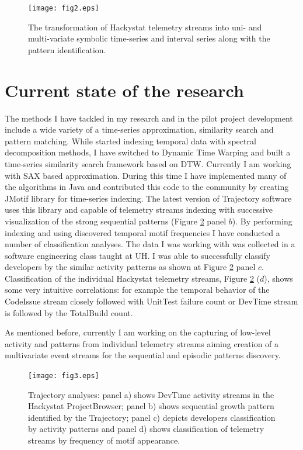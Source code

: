 \documentclass[11pt,oneside]{article}
\begin{document}
\begin{figure}[tbp]
   \centering
   \texttt{[image: fig2.eps]}
   \caption{The transformation of Hackystat telemetry streams into uni- and multi-variate symbolic time-series and interval series along with the pattern identification.}
   \label{fig:fig2}
\end{figure}

\section{Current state of the research}
The methods I have tackled in my research and in the pilot project development include a wide variety of a time-series approximation, similarity search and pattern matching. While started indexing temporal data with spectral decomposition methods, I have switched to Dynamic Time Warping and built a time-series similarity search framework based on DTW. Currently I am working with SAX based approximation. During this time I have implemented many of the algorithms in Java and contributed this code to the community by creating JMotif library for time-series indexing. The latest version of Trajectory software uses this library and capable of telemetry streams indexing with successive visualization of the strong sequential patterns (Figure \ref{fig:fig3} panel $b$). By performing indexing and using discovered temporal motif frequencies I have conducted a number of classification analyses. The data I was working with was collected in a software engineering class taught at UH. I was able to successfully classify developers by the similar activity patterns as shown at Figure \ref{fig:fig3} panel $c$. Classification of the individual Hackystat telemetry streams, Figure \ref{fig:fig3} ($d$), shows some very intuitive correlations: for example the temporal behavior of the CodeIssue stream closely followed with UnitTest failure count or DevTime stream is followed by the TotalBuild count.

As mentioned before, currently I am working on the capturing of low-level activity and patterns from individual telemetry streams aiming creation of a multivariate event streams for the sequential and episodic patterns discovery.

\begin{figure}[tbp]
   \centering
   \texttt{[image: fig3.eps]}
   \caption{Trajectory analyses: panel a) shows DevTime activity streams in the Hackystat ProjectBrowser; panel b) shows sequential growth pattern identified by the Trajectory; panel c) depicts developers classification by activity patterns and panel d) shows classification of telemetry streams by frequency of motif appearance.}
   \label{fig:fig3}
\end{figure}
\end{document}
